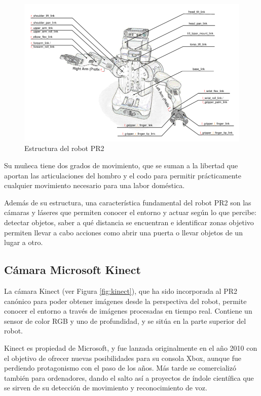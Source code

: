 \documentclass[12pt,spanish,chapterprefix, numbers=noenddot]{book}
\numberwithin{equation}{section}
\numberwithin{figure}{section}
\begin{document}
\begin{figure}[hbt!]
\centering
\includegraphics[width=12cm]{Figs/PR2_structure.png}
\par
\caption{\label{fig:pr2Structure}Estructura del robot PR2}
\end{figure}

Su muñeca tiene dos grados de movimiento, que se suman a la libertad que aportan las articulaciones del hombro y el codo para permitir prácticamente cualquier movimiento necesario para una labor doméstica.

Además de su estructura, una característica fundamental del robot PR2 son las cámaras y láseres que permiten conocer el entorno y actuar según lo que percibe: detectar objetos, saber a qué distancia se encuentran e identificar zonas objetivo permiten llevar a cabo acciones como abrir una puerta o llevar objetos de un lugar a otro.

\subsection{Cámara Microsoft Kinect}
La cámara Kinect (ver Figura \ref{fig:kinect}), que ha sido incorporada al PR2 canónico para poder obtener imágenes desde la perspectiva del robot, permite conocer el entorno a través de imágenes procesadas en tiempo real. 
Contiene un sensor de color RGB y uno de profundidad, y se sitúa en la parte superior del robot. 

Kinect es propiedad de Microsoft, y fue lanzada originalmente en el año 2010 con el objetivo de ofrecer nuevas posibilidades para su consola Xbox, aunque fue perdiendo protagonismo con el paso de los años. Más tarde se comercializó también para ordenadores, dando el salto así a proyectos de índole científica que se sirven de su detección de movimiento y reconocimiento de voz. 
\end{document}
